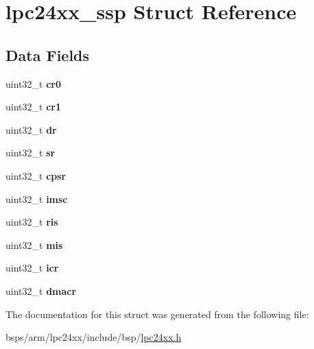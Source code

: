 \hypertarget{structlpc24xx__ssp}{}\section{lpc24xx\+\_\+ssp Struct Reference}
\label{structlpc24xx__ssp}
\subsection*{Data Fields}
\begin{DoxyCompactItemize}
\item 
\mbox{\label{structlpc24xx__ssp_ad89d4d45e9f359bdc69eb118d8655f01}} 
uint32\+\_\+t {\bfseries cr0}
\item 
\mbox{\label{structlpc24xx__ssp_ab9b9873d9b0228f99b8c1c99318e82c7}} 
uint32\+\_\+t {\bfseries cr1}
\item 
\mbox{\label{structlpc24xx__ssp_a210a2f6a33522052a848fed9bb70d14b}} 
uint32\+\_\+t {\bfseries dr}
\item 
\mbox{\label{structlpc24xx__ssp_a04e9b33359e389303d15a15dab242fbf}} 
uint32\+\_\+t {\bfseries sr}
\item 
\mbox{\label{structlpc24xx__ssp_aa8a9b145716b5c9ec83e0c80e7d7e42c}} 
uint32\+\_\+t {\bfseries cpsr}
\item 
\mbox{\label{structlpc24xx__ssp_a0795157eaf4b3205e209b52f5074ae6c}} 
uint32\+\_\+t {\bfseries imsc}
\item 
\mbox{\label{structlpc24xx__ssp_aaf7709cc58ba18020fbb89bd229df083}} 
uint32\+\_\+t {\bfseries ris}
\item 
\mbox{\label{structlpc24xx__ssp_a2fe5823a3e6c7a455691a1c8387265a0}} 
uint32\+\_\+t {\bfseries mis}
\item 
\mbox{\label{structlpc24xx__ssp_a67ab5eb2d7ce107ac848f7b34d812f20}} 
uint32\+\_\+t {\bfseries icr}
\item 
\mbox{\label{structlpc24xx__ssp_a63c69e9b4d1a4b27515be9375ffa49b4}} 
uint32\+\_\+t {\bfseries dmacr}
\end{DoxyCompactItemize}


The documentation for this struct was generated from the following file\+:\begin{DoxyCompactItemize}
\item 
bsps/arm/lpc24xx/include/bsp/\mbox{\hyperlink{lpc24xx_8h}{lpc24xx.\+h}}\end{DoxyCompactItemize}

